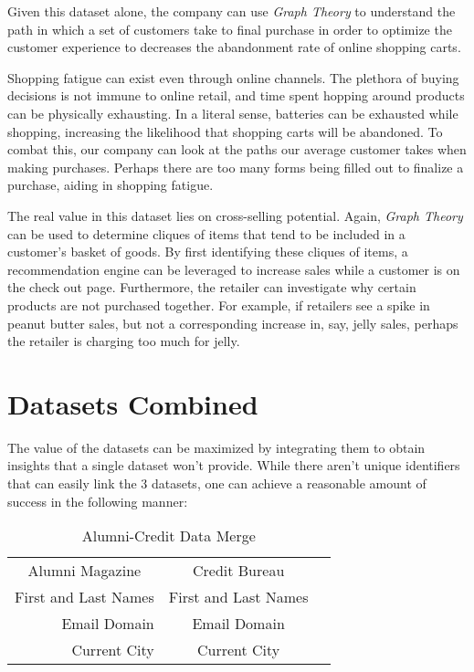 \documentclass[letterpaper,12pt]{article}
\begin{document}
Given this dataset alone, the company can use \emph{Graph Theory} to understand the path in which a set of customers take to final purchase in order to optimize the customer experience to decreases the abandonment rate of online shopping carts.

Shopping fatigue can exist even through online channels.  The plethora of buying decisions is not immune to online retail, and time spent hopping around products can be physically exhausting.  In a literal sense, batteries can be exhausted while shopping, increasing the likelihood that shopping carts will be abandoned.  To combat this, our company can look at the paths our average customer takes when making purchases.  Perhaps there are too many forms being filled out to finalize a purchase, aiding in shopping fatigue.

The real value in this dataset lies on cross-selling potential.  Again, \emph{Graph Theory} can be used to determine cliques of items that tend to be included in a customer's basket of goods.  By first identifying these cliques of items, a recommendation engine can be leveraged to increase sales while a customer is on the check out page.  Furthermore, the retailer can investigate why certain products are not purchased together.  For example, if retailers see a spike in peanut butter sales, but not a corresponding increase in, say, jelly sales, perhaps the retailer is charging too much for jelly.

\section{Datasets Combined}
The value of the datasets can be maximized by integrating them to obtain insights that a single dataset won't provide.  While there aren't unique identifiers that can easily link the 3 datasets, one can achieve a reasonable amount of success in the following manner:

\begin{table}
  \caption{Alumni-Credit Data Merge}
  \centering
  \begin{tabular}{ |r|c|c|}
    \multicolumn{1}{c}{Alumni Magazine}
    &  \multicolumn{1}{c}{Credit Bureau} \\
    \cline{1-2}
    First and Last Names & First and Last Names \\
    \cline{1-2}
    Email Domain & Email Domain \\
    \cline{1-2}
    Current City & Current City \\
    \cline{1-2}
  \end{tabular}
\end{table}
\end{document}
